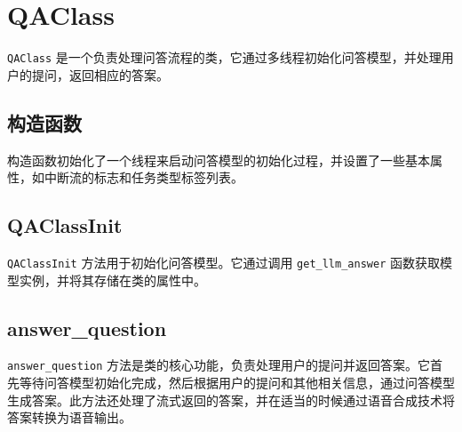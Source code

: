 \documentclass[]{article}
\begin{document}
	\section{QAClass}
	
	\texttt{QAClass} 是一个负责处理问答流程的类，它通过多线程初始化问答模型，并处理用户的提问，返回相应的答案。
	
	\subsection{构造函数}
	构造函数初始化了一个线程来启动问答模型的初始化过程，并设置了一些基本属性，如中断流的标志和任务类型标签列表。
	
	\subsection{QAClassInit}
	\texttt{QAClassInit} 方法用于初始化问答模型。它通过调用 \texttt{get\_llm\_answer} 函数获取模型实例，并将其存储在类的属性中。
	
	\subsection{answer\_question}
	\texttt{answer\_question} 方法是类的核心功能，负责处理用户的提问并返回答案。它首先等待问答模型初始化完成，然后根据用户的提问和其他相关信息，通过问答模型生成答案。此方法还处理了流式返回的答案，并在适当的时候通过语音合成技术将答案转换为语音输出。
	
\end{document}
